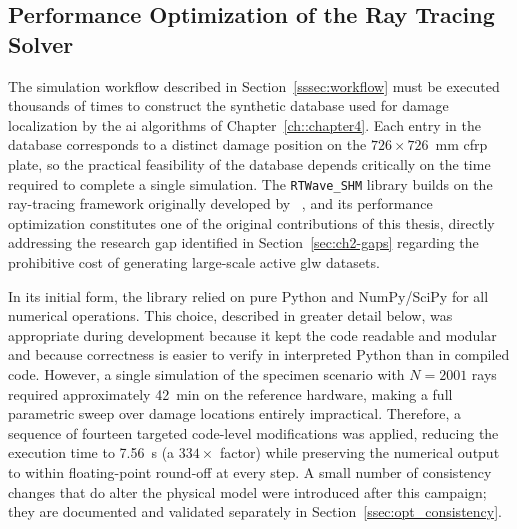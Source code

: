     \subsection{Performance Optimization of the Ray Tracing Solver} \label{sec:rt_optimization}
        The simulation workflow described in Section~\ref{sssec:workflow} must be executed thousands of times to construct the synthetic database used for damage localization by the \acrshort{ai} algorithms of Chapter~\ref{ch::chapter4}. Each entry in the database corresponds to a distinct damage position on the $726 \times 726$~mm \acrshort{cfrp} plate, so the practical feasibility of the database depends critically on the time required to complete a single simulation. The \texttt{RTWave\_SHM} library builds on the ray-tracing framework originally developed by \citeauthor{DF_GLW-08}~\cite{DF_GLW-08}, and its performance optimization constitutes one of the original contributions of this thesis, directly addressing the research gap identified in Section~\ref{sec:ch2-gaps} regarding the prohibitive cost of generating large-scale active \acrshort{glw} datasets.
        
        In its initial form, the library relied on pure Python and NumPy/SciPy for all numerical operations.  This choice, described in greater detail below, was appropriate during development because it kept the code readable and modular and because correctness is easier to verify in interpreted Python than in compiled code. However, a single simulation of the specimen scenario with $N = 2001$ rays required approximately \SI{42}{\minute} on the reference hardware, making a full parametric sweep over damage locations entirely impractical. Therefore, a sequence of fourteen targeted code-level modifications was applied, reducing the execution time to \SI{7.56}{\second} (a $334\times$ factor) while preserving the numerical output to within floating-point round-off at every step. A small number of consistency changes that do alter the physical model were introduced after this campaign; they are documented and validated separately in Section~\ref{ssec:opt_consistency}.
        
